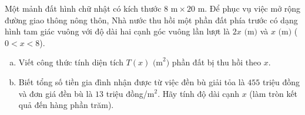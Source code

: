 \begin{bt}%
Một mảnh đất hình chữ nhật có kích thước $8\text{ m} \times 20\text{ m}$. Để phục vụ việc mở rộng đường giao thông nông thôn, Nhà nước thu hồi một phần đất phía trước có dạng hình tam giác vuông với độ dài hai cạnh góc vuông lần lượt là $2x\text{ (m)}$ và $x\text{ (m)}$ ($0 < x < 8$).
\begin{enumerate}[a)]
	\item Viết công thức tính diện tích $T(x)\text{ (m}^2\text{)}$ phần đất bị thu hồi theo $x$.
	\item Biết tổng số tiền gia đình nhận được từ việc đền bù giải tỏa là $455$ triệu đồng và đơn giá đền bù là $13$ triệu đồng/$\text{m}^2$. Hãy tính độ dài cạnh $x$ (làm tròn kết quả đến hàng phần trăm).
\end{enumerate}
\end{bt}


